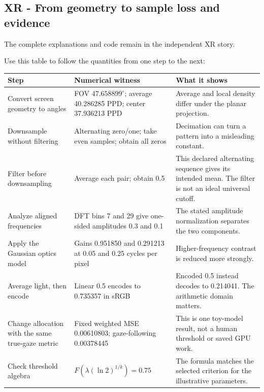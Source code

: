 \subsection{XR - From geometry to sample loss and evidence}\label{appendix-92ff77d4dfdc-xr---from-geometry-to-sample-loss-and-evidence}

The complete explanations and code remain in {the independent XR story}.

Use this table to follow the quantities from one step to the next:

{\def\LTcaptype{none} %
\begin{longtable}[]{@{}
  >{\raggedright\arraybackslash}p{}
  >{\raggedright\arraybackslash}p{}
  >{\raggedright\arraybackslash}p{}@{}}
\toprule\noalign{}
\begin{minipage}[b]{\linewidth}\raggedright
Step
\end{minipage} & \begin{minipage}[b]{\linewidth}\raggedright
Numerical witness
\end{minipage} & \begin{minipage}[b]{\linewidth}\raggedright
What it shows
\end{minipage} \\
\midrule\noalign{}
\endhead
\bottomrule\noalign{}
\endlastfoot
Convert screen geometry to angles & FOV \(47.658899^\circ\); average 40.286285 PPD; center 37.936213 PPD & Average and local density differ under the planar projection. \\
Downsample without filtering & Alternating zero/one; take even samples; obtain all zeros & Decimation can turn a pattern into a misleading constant. \\
Filter before downsampling & Average each pair; obtain 0.5 & This declared alternating sequence gives its intended mean. The filter is not an ideal universal cutoff. \\
Analyze aligned frequencies & DFT bins 7 and 29 give one-sided amplitudes 0.3 and 0.1 & The stated amplitude normalization separates the two components. \\
Apply the Gaussian optics model & Gains 0.951850 and 0.291213 at 0.05 and 0.25 cycles per pixel & Higher-frequency contrast is reduced more strongly. \\
Average light, then encode & Linear 0.5 encodes to 0.735357 in sRGB & Encoded 0.5 instead decodes to 0.214041. The arithmetic domain matters. \\
Change allocation with the same true-gaze metric & Fixed weighted MSE 0.00610803; gaze-following 0.00378445 & This is one toy-model result, not a human threshold or saved GPU work. \\
Check threshold algebra & \(F\!\left(\lambda(\ln2)^{1/k}\right)=0.75\) & The formula matches the selected criterion for the illustrative parameters. \\
\end{longtable}
}

